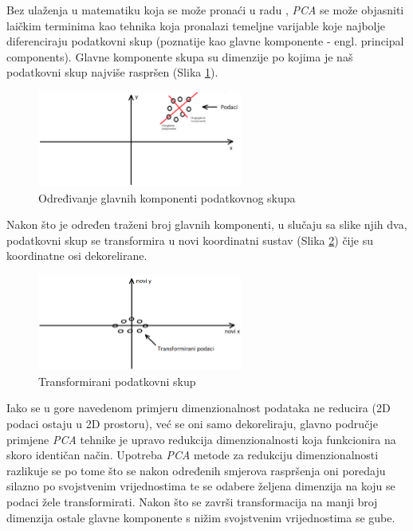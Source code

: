 \documentclass[times, utf8, proizvoljni, numeric]{fer}
\begin{document}
Bez ulaženja u matematiku koja se može pronaći u radu \cite{PCA}, \textit{PCA} se može objasniti laičkim terminima kao tehnika koja pronalazi temeljne varijable koje najbolje diferenciraju podatkovni skup (poznatije kao glavne komponente - engl. principal components). Glavne komponente skupa su dimenzije po kojima je naš podatkovni skup najviše raspršen (Slika \ref{fg:pca_start}).

\begin{figure}[!ht]
	\begin{center}
		\captionsetup{justification=centering}
		\includegraphics[width=0.6\textwidth]{./imgs/pca_start.png}
		\caption{Određivanje glavnih komponenti podatkovnog skupa}
		\label{fg:pca_start}
	\end{center}
\end{figure}

Nakon što je određen traženi broj glavnih komponenti, u slučaju sa slike njih dva, podatkovni skup se transformira u novi koordinatni sustav (Slika \ref{fg:pca_end}) čije su koordinatne osi dekorelirane.

\begin{figure}[H]
	\begin{center}
		\captionsetup{justification=centering}
		\includegraphics[width=0.6\textwidth]{./imgs/pca_end.png}
		\caption{Transformirani podatkovni skup}
		\label{fg:pca_end}
	\end{center}
\end{figure}

Iako se u gore navedenom primjeru dimenzionalnost podataka ne reducira (2D podaci ostaju u 2D prostoru), već se oni samo dekoreliraju, glavno područje primjene \textit{PCA} tehnike je upravo redukcija dimenzionalnosti koja funkcionira na skoro identičan način. Upotreba \textit{PCA} metode za redukciju dimenzionalnosti razlikuje se po tome što se nakon određenih smjerova raspršenja oni poredaju silazno po svojstvenim vrijednostima te se odabere željena dimenzija na koju se podaci žele transformirati. Nakon što se završi transformacija na manji broj dimenzija ostale glavne komponente s nižim svojstvenim vrijednostima se gube. 
\end{document}
